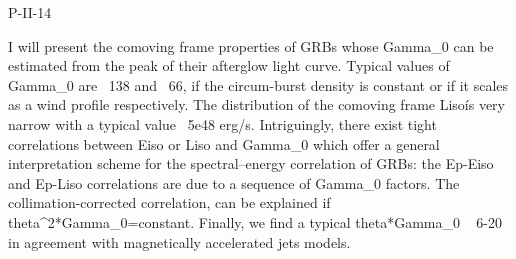 P-II-14


\bigskip



\bigskip

\noindent I will present the comoving frame properties of GRBs whose Gamma_0 can be estimated from the peak of their afterglow light curve. Typical values of Gamma_0 are ~138 and ~66, if the circum-burst density is constant or if it scales as a wind profile respectively. The distribution of the comoving frame Liso\' is very narrow  with a typical value ~5e48 erg/s. Intriguingly, there exist tight correlations between Eiso or Liso and Gamma_0 which offer a general interpretation scheme for the spectral--energy correlation of GRBs: the Ep-Eiso and Ep-Liso correlations are due to a sequence of Gamma_0 factors. The collimation-corrected correlation, can be explained  if theta^2*Gamma_0=constant. Finally, we find a typical theta*Gamma_0 ~ 6-20 in agreement with magnetically accelerated jets models.
